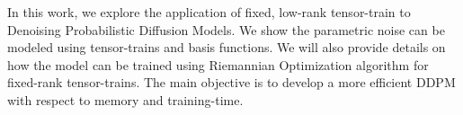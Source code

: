 \documentclass[11pt]{article}
\begin{document}
    In this work, we explore the application of fixed, low-rank tensor-train to Denoising Probabilistic Diffusion Models.
    We show the parametric noise can be modeled using tensor-trains and basis functions.
    We will also provide details on how the model can be trained using Riemannian Optimization algorithm for fixed-rank
    tensor-trains.
    The main objective is to develop a more efficient DDPM with respect to memory and training-time.
\end{document}
